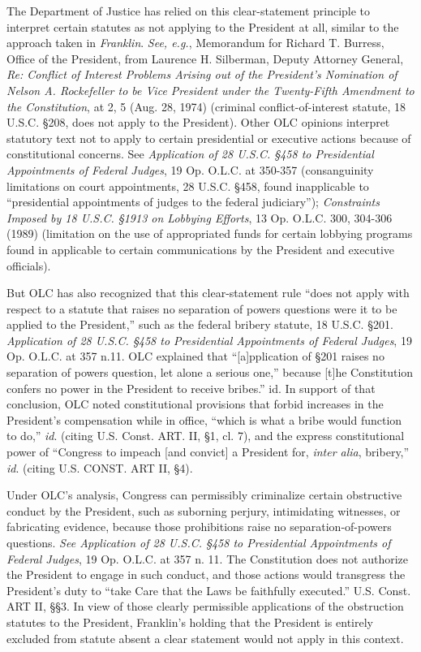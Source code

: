The Department of Justice has relied on this clear-statement principle to interpret certain statutes as not applying to the President at all, similar to the approach taken in \textit{Franklin}.
\textit{See, e.g.}, Memorandum for Richard T. Burress, Office of the President, from Laurence H. Silberman, Deputy Attorney General, \textit{Re: Conflict of Interest Problems Arising out of the President's Nomination of Nelson A. Rockefeller to be Vice President under the Twenty-Fifth Amendment to the Constitution}, at 2, 5 (Aug. 28, 1974) (criminal conflict-of-interest statute, 18 U.S.C. \S 208, does not apply to the President).
Other OLC opinions interpret statutory text not to apply to certain presidential or executive actions because of constitutional concerns.
See \textit{Application of 28 U.S.C. \S 458 to Presidential Appointments of Federal Judges}, 19 Op. O.L.C. at 350-357 (consanguinity limitations on court appointments, 28 U.S.C. \S 458, found inapplicable to “presidential appointments of judges to the federal judiciary”);
\textit{Constraints Imposed by 18 U.S.C. \S 1913 on Lobbying Efforts}, 13 Op. O.L.C. 300, 304-306 (1989) (limitation on the use of appropriated funds for certain lobbying programs found in applicable to certain communications by the President and executive officials).

But OLC has also recognized that this clear-statement rule “does not apply with respect to a statute that raises no separation of powers questions were it to be applied to the President,” such as the federal bribery statute, 18 U.S.C. \S 201.
\textit{Application of 28 U.S.C. \S 458 to Presidential Appointments of Federal Judges}, 19 Op. O.L.C. at 357 n.11. OLC explained that “[a]pplication of \S 201 raises no separation of powers question, let alone a serious one,” because [t]he Constitution confers no power in the President to receive bribes.” id.
In support of that conclusion, OLC noted constitutional provisions that forbid increases in the President’s compensation while in office, “which is what a bribe would function to do,” \textit{id}. (citing U.S. Const. ART. II, \S 1, cl. 7), and the express constitutional power of “Congress to impeach [and convict] a President for, \textit{inter alia}, bribery,” \textit{id}. (citing U.S. CONST. ART II, \S 4).

Under OLC’s analysis, Congress can permissibly criminalize certain obstructive conduct by the President, such as suborning perjury, intimidating witnesses, or fabricating evidence, because those prohibitions raise no separation-of-powers questions.
\textit{See Application of 28 U.S.C. \S 458 to Presidential Appointments of Federal Judges}, 19 Op. O.L.C. at 357 n. 11.
The Constitution does not authorize the President to engage in such conduct, and those actions would transgress the President’s duty to “take Care that the Laws be faithfully executed.” U.S. Const. ART II, \S\S 3.
In view of those clearly permissible applications of the obstruction statutes to the President, Franklin’s holding that the President is entirely excluded from statute absent a clear statement would not apply in this context.

